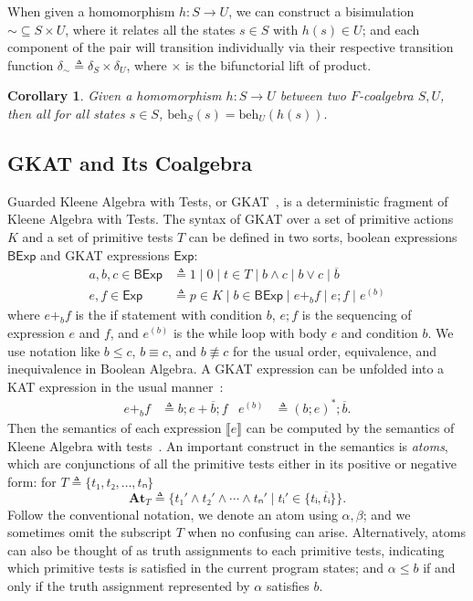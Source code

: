 \documentclass[conference]{IEEEtran}
\newtheorem{corollary}[theorem]{Corollary}
\newcommand{\At}{\mathbf{At}}
\newcommand{\theoryOf}[1]{\ensuremath{\mathsf{#1}}}
\newcommand{\Exp}{\theoryOf{Exp}}
\newcommand{\BExp}{\theoryOf{BExp}}
\begin{document}
When given a homomorphism \(h: S → U\), we can construct a bisimulation \({∼} ⊆ S × U\), where it relates all the states \(s ∈ S\) with \(h(s) ∈ U\); and each component of the pair will transition individually via their respective transition function \(δ_∼ ≜ δ_S × δ_U\), where \(×\) is the bifunctorial lift of product.
\begin{corollary}\label{thm:hom-preserves-semantics}
    Given a homomorphism \(h: S → U\) between two \(F\)-coalgebra \(S, U\), then all for all states \(s ∈ S\), \(\mathrm{beh}_S(s) = \mathrm{beh}_U(h(s)).\)
\end{corollary}

\subsection{GKAT and Its Coalgebra}

Guarded Kleene Algebra with Tests, or GKAT~\cite{smolka_GuardedKleeneAlgebra_2020}, is a deterministic fragment of Kleene Algebra with Tests. 
The syntax of GKAT over a set of primitive actions \(K\) and a set of primitive tests \(T\) can be defined in two sorts, boolean expressions \(\BExp\) and GKAT expressions \(\Exp\):
\begin{align*}
    a, b, c ∈ \BExp 
        & ≜ 1 ∣ 0 ∣ t ∈ T ∣ b ∧ c ∣ b ∨ c ∣ \overline{b} \\  
    e, f ∈ \Exp 
        & ≜ p ∈ K ∣ b ∈ \BExp ∣ e +_b f ∣ e ; f ∣ e^{(b)} 
\end{align*}
where \(e +_b f\) is the if statement with condition \(b\), \(e;f\) is the sequencing of expression \(e\) and \(f\), and \(e^{(b)}\) is the while loop with body \(e\) and condition \(b\).
We use notation like \(b ≤ c\), \(b ≡ c\), and \(b ≢ c\) for the usual order, equivalence, and inequivalence in Boolean Algebra.
A GKAT expression can be unfolded into a KAT expression in the usual manner~\cite{kozen_KleeneAlgebraTests_1997c}:
\begin{align*}
    e +_b f & ≜ b; e + \overline{b}; f &
    e^{(b)} & ≜ (b; e)^*; \overline{b}.
\end{align*}
Then the semantics of each expression \(⟦e⟧\) can be computed by the semantics of Kleene Algebra with tests~\cite{kozen_KleeneAlgebraTests_1997c}.
An important construct in the semantics is \emph{atoms}, which are conjunctions of all the primitive tests either in its positive or negative form: for \(T ≜ \{t₁, t₂, …, tₙ\}\)
\[\At_T ≜ \{t₁' ∧ t₂' ∧ ⋯ ∧ tₙ' ∣ tᵢ' ∈ \{tᵢ, \overline{tᵢ}\}\}.\]
Follow the conventional notation, we denote an atom using \(α, β\); and we sometimes omit the subscript \(T\) when no confusing can arise.
Alternatively, atoms can also be thought of as truth assignments to each primitive tests, indicating which primitive tests is satisfied in the current program states; and \(α ≤ b\) if and only if the truth assignment represented by \(α\) satisfies \(b\).
\end{document}
